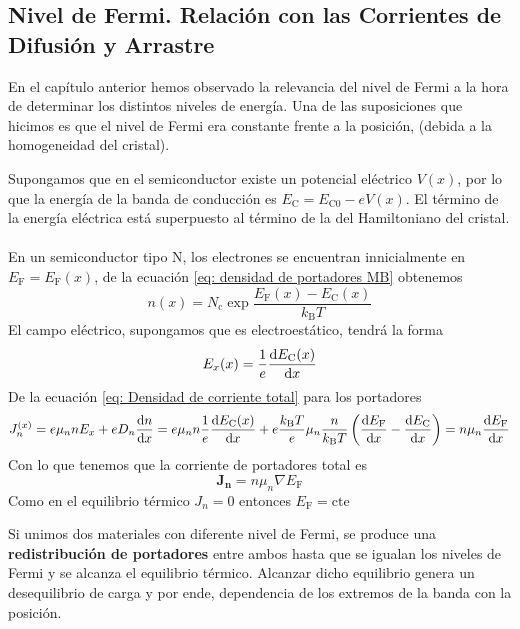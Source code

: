 \subsection{Nivel de Fermi. Relación con las Corrientes de Difusión y Arrastre} \label{sec: Nivel de Fermi. Relacion con las corrientes de difusion y arrastre}
 En el capítulo anterior hemos observado la relevancia del nivel de Fermi a la hora de determinar los distintos niveles de energía. Una de las suposiciones que hicimos es que el nivel de Fermi era constante frente a la posición, (debida a la homogeneidad del cristal).
\begin{tcolorbox}[colback=applegreen!20, colframe=applegreen, title=Demostración: En equlibrio termodinámico el nivel de Fermi es constante con la posición.]
Supongamos que en el semiconductor existe un potencial eléctrico $V(x)$, por lo que la energía de la banda de conducción es $E_\mathrm{C}=E_\mathrm{C0}-eV(x)$. El término de la energía eléctrica está superpuesto al término de la del Hamiltoniano del cristal.\\\\
En un semiconductor tipo N, los electrones se encuentran innicialmente en $E_\mathrm{F}=E_\mathrm{F}(x)$, de la ecuación \ref{eq: densidad de portadores MB} obtenemos
$$n(x)=N_\mathrm{c} \exp{\frac{E_\mathrm{F}(x)-E_\mathrm{C}(x)}{k_\mathrm{B}T}}$$ El campo eléctrico, supongamos que es electroestático, tendrá la forma$$E_x(x)=\frac{1}{e}\diff[]{E_\mathrm{C}(x)}{x}$$
De la ecuación \ref{eq: Densidad de corriente total} para los portadores $$J_n^{(x)}=e \mu_n n E_x+e D_n \diff[]{n}{x}=e\mu_n n\frac{1}{e}\diff[]{E_\mathrm{C}(x)}{x} +e\frac{k_\mathrm{B}T}{e}\mu_n \frac{n}{k_\mathrm{B}T} \left( \diff[]{E_\mathrm{F}}{x}-\diff[]{E_\mathrm{C}}{x}\right)=n\mu_n \diff[]{E_\mathrm{F}}{x}$$
Con lo que tenemos que la corriente de portadores total es $$\mathbf{J_n}=n\mu _n \nabla E_\mathrm{F}$$ Como en el equilibrio térmico $J_n=0$ entonces $E_\mathrm{F}=\text{cte}$
\end{tcolorbox}
\noindent Si unimos dos materiales con diferente nivel de Fermi, se produce una \textbf{redistribución de portadores} entre ambos hasta que se igualan los niveles de Fermi y se alcanza el equilibrio térmico. Alcanzar dicho equilibrio genera un desequilibrio de carga y por ende, dependencia de los extremos de la banda con la posición. 
\newpage
